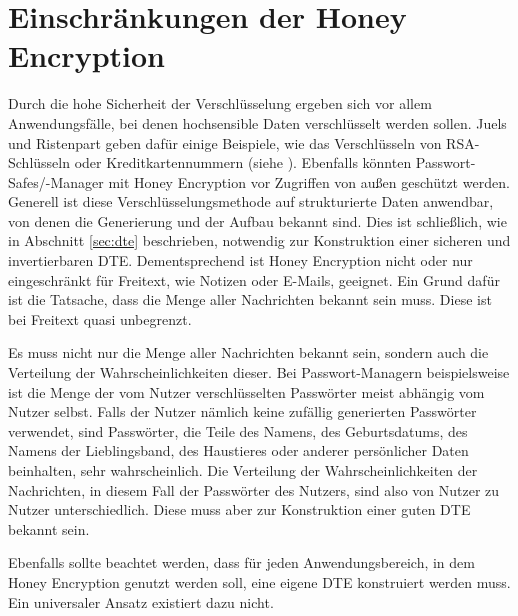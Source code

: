 \section{Einschränkungen der Honey Encryption}
\label{sec:probleme}

Durch die hohe Sicherheit der Verschlüsselung ergeben sich vor allem Anwendungsfälle, bei denen hochsensible Daten verschlüsselt werden sollen. Juels und Ristenpart geben dafür einige Beispiele, wie das Verschlüsseln von RSA-Schlüsseln oder Kreditkartennummern (siehe \cite{EURO2014, IEEE2014}). Ebenfalls könnten Passwort-Safes/-Manager mit Honey Encryption vor Zugriffen von außen geschützt werden. Generell ist diese Verschlüsselungsmethode auf strukturierte Daten anwendbar, von denen die Generierung und der Aufbau bekannt sind. Dies ist schließlich, wie in Abschnitt \ref{sec:dte} beschrieben, notwendig zur Konstruktion einer sicheren und invertierbaren DTE. Dementsprechend ist Honey Encryption nicht oder nur eingeschränkt für Freitext, wie Notizen oder E-Mails, geeignet. Ein Grund dafür ist die Tatsache, dass die Menge aller Nachrichten bekannt sein muss. Diese ist bei Freitext quasi unbegrenzt.

Es muss nicht nur die Menge aller Nachrichten bekannt sein, sondern auch die Verteilung der Wahrscheinlichkeiten dieser. Bei Passwort-Managern beispielsweise ist die Menge der vom Nutzer verschlüsselten Passwörter meist abhängig vom Nutzer selbst. Falls der Nutzer nämlich keine zufällig generierten Passwörter verwendet, sind Passwörter, die Teile des Namens, des Geburtsdatums, des Namens der Lieblingsband, des Haustieres oder anderer persönlicher Daten beinhalten, sehr wahrscheinlich. Die Verteilung der Wahrscheinlichkeiten der Nachrichten, in diesem Fall der Passwörter des Nutzers, sind also von Nutzer zu Nutzer unterschiedlich. Diese muss aber zur Konstruktion einer guten DTE bekannt sein.

Ebenfalls sollte beachtet werden, dass für jeden Anwendungsbereich, in dem Honey Encryption genutzt werden soll, eine eigene DTE konstruiert werden muss. Ein universaler Ansatz existiert dazu nicht.

